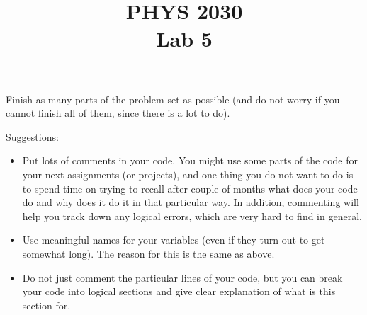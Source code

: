 \documentclass[letterpaper]{article}
\title{PHYS 2030 \\Lab 5}
\begin{document}
\maketitle
Finish as many parts of the problem set as possible (and do not worry if you cannot finish all of them, since there is a lot to do).

Suggestions: 
\begin{itemize}
\item Put lots of comments in your code. You might use some parts of the code for your next assignments (or projects), and one thing you do not want to do is to spend time on trying to recall after couple of months what does your code do and why does it do it in that particular way. In addition, commenting will help you track down any logical errors, which are very hard to find in general.
\item  Use meaningful names for your variables (even if they turn out to get somewhat long). The reason for this is the same as above.
\item Do not just comment the particular lines of your code, but you can break your code into logical sections and give clear explanation of what is this section for.
\end{itemize}
\end{document}
